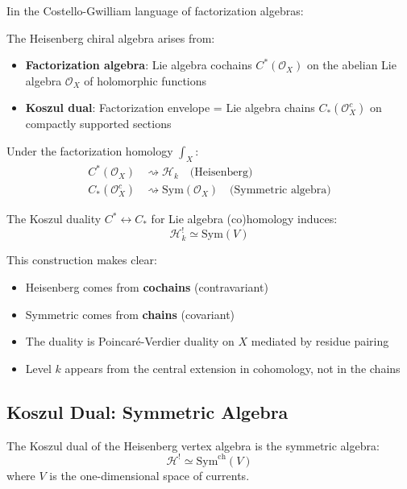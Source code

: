 Iin the Costello-Gwilliam language of factorization algebras:

\begin{theorem}
\label{thm:rhagavendran-heisenberg}
The Heisenberg chiral algebra arises from:
\begin{itemize}
\item \textbf{Factorization algebra}: Lie algebra cochains $C^*(\mathcal{O}_X)$ on the 
      abelian Lie algebra $\mathcal{O}_X$ of holomorphic functions
\item \textbf{Koszul dual}: Factorization envelope = Lie algebra chains $C_*(\mathcal{O}_X^c)$ 
      on compactly supported sections
\end{itemize}

Under the factorization homology $\int_X$:
\begin{align*}
C^*(\mathcal{O}_X) &\rightsquigarrow \mathcal{H}_k \quad \text{(Heisenberg)} \\
C_*(\mathcal{O}_X^c) &\rightsquigarrow \text{Sym}(\mathcal{O}_X) \quad \text{(Symmetric algebra)}
\end{align*}

The Koszul duality $C^* \leftrightarrow C_*$ for Lie algebra (co)homology induces:
$$\mathcal{H}_k^! \simeq \text{Sym}(V)$$
\end{theorem}

This construction makes clear:
\begin{itemize}
\item Heisenberg comes from \textbf{cochains} (contravariant)
\item Symmetric comes from \textbf{chains} (covariant)
\item The duality is Poincaré-Verdier duality on $X$ mediated by residue pairing
\item Level $k$ appears from the central extension in cohomology, not in the chains
\end{itemize}






\subsection{Koszul Dual: Symmetric Algebra}

\begin{theorem}\label{thm:heisenberg-koszul-correct}
The Koszul dual of the Heisenberg vertex algebra is the symmetric algebra:
$$\mathcal{H}^! \simeq \text{Sym}^{\text{ch}}(V)$$
where $V$ is the one-dimensional space of currents.
\end{theorem}


